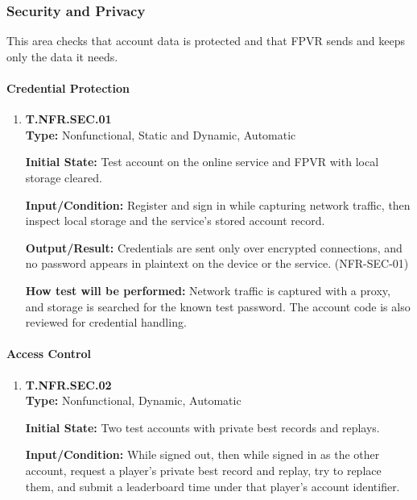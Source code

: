 \documentclass[12pt, titlepage]{article}
\begin{document}
\subsubsection{Security and Privacy}

This area checks that account data is protected and that FPVR sends and keeps only the
data it needs.

{\sloppy
\paragraph{Credential Protection}

\begin{enumerate}

\item{\hypertarget{test-nfr-sec-01}{}\textbf{T.NFR.SEC.01}\\}
\textbf{Type:} Nonfunctional, Static and Dynamic, Automatic

\textbf{Initial State:} Test account on the online service and FPVR with local storage
cleared.

\textbf{Input/Condition:} Register and sign in while capturing network traffic, then
inspect local storage and the service's stored account record.

\textbf{Output/Result:} Credentials are sent only over encrypted connections, and no
password appears in plaintext on the device or the service. (\mbox{NFR-SEC-01})

\textbf{How test will be performed:} Network traffic is captured with a proxy, and
storage is searched for the known test password. The account code is also reviewed for
credential handling.

\end{enumerate}

\paragraph{Access Control}

\begin{enumerate}

\item{\hypertarget{test-nfr-sec-02}{}\textbf{T.NFR.SEC.02}\\}
\textbf{Type:} Nonfunctional, Dynamic, Automatic

\textbf{Initial State:} Two test accounts with private best records and replays.

\textbf{Input/Condition:} While signed out, then while signed in as the other
account, request a player's private best record and replay, try to replace them,
and submit a leaderboard time under that player's account identifier.


\end{enumerate}}
\end{document}

